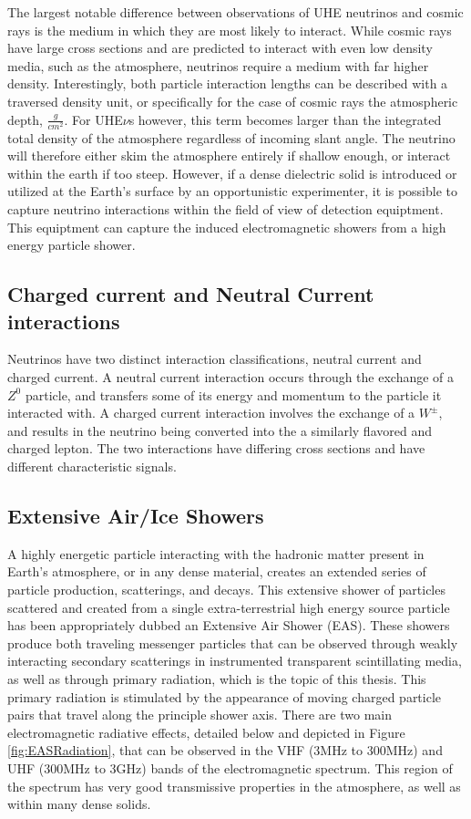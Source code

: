 	The largest notable difference between observations of UHE neutrinos and cosmic rays is the medium in which they are most likely to interact.  While cosmic rays have large cross sections and are predicted to interact with even low density media, such as the atmosphere, neutrinos require a medium with far higher density.  Interestingly, both particle interaction lengths can be described with a traversed density unit, or specifically for the case of cosmic rays the atmospheric depth, $\frac{g}{cm^{2}}$.  For UHE$\nu$s however, this term becomes larger than the integrated total density of the atmosphere regardless of incoming slant angle.  The neutrino will therefore either skim the atmosphere entirely if shallow enough, or interact within the earth if too steep.  However, if a dense dielectric solid is introduced or utilized at the Earth's surface by an opportunistic experimenter, it is possible to capture neutrino interactions within the field of view of detection equiptment.  This equiptment can capture the induced electromagnetic showers from a high energy particle shower.
	
	\subsection{Charged current and Neutral Current interactions} 
		Neutrinos have two distinct interaction classifications, neutral current and charged current.  A neutral current interaction occurs through the exchange of a $Z^{0}$ particle, and transfers some of its energy and momentum to the particle it interacted with.  A charged current interaction involves the exchange of a $W^{\pm}$, and results in the neutrino being converted into the a similarly flavored and charged lepton.  The two interactions have differing cross sections and have different characteristic signals.
				

	\subsection{Extensive Air/Ice Showers}
		A highly energetic particle interacting with the hadronic matter present in Earth's atmosphere, or in any  dense material, creates an extended series of particle production, scatterings, and decays.  This extensive shower of particles scattered and created from a single extra-terrestrial high energy source particle has been appropriately dubbed an Extensive Air Shower (EAS).  These showers produce both traveling messenger particles that can be observed through weakly interacting secondary scatterings in instrumented transparent scintillating media, as well as through primary radiation, which is the topic of this thesis.  This primary radiation is stimulated by the appearance of moving charged particle pairs that travel along the principle shower axis.  There are two main electromagnetic radiative effects, detailed below and depicted in Figure \ref{fig:EASRadiation}, that can be observed in the  VHF (3MHz to 300MHz) and UHF (300MHz to 3GHz) bands of the electromagnetic spectrum.  This region of the spectrum has very good transmissive properties in the atmosphere, as well as within many dense solids.\cite{Besson2009348}\cite{VuFind-000215473}\cite{Barrella:2010vs}
		

